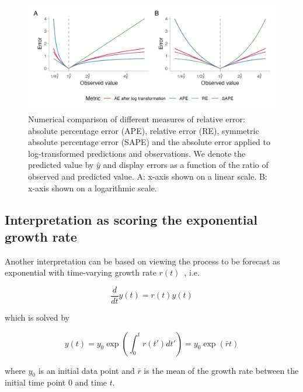 \documentclass{article}
\begin{document}
\begin{figure}[h!]
\centering
\includegraphics[width = 1\textwidth]{output/figures/different-relative-errors.png}
\caption{Numerical comparison of different measures of relative error: absolute percentage error (APE), relative error (RE), symmetric absolute percentage error (SAPE) and the absolute error applied to log-transformed predictions and observations. We denote the predicted value by $\hat{y}$ and display errors as a function of the ratio of observed and predicted value. A: x-axis shown on a linear scale. B: x-axis shown on a logarithmic scale.}
\label{fig:SAPE}
\end{figure}





\subsection{Interpretation as scoring the exponential growth rate}
\label{sec:methods:growthrate}

Another interpretation can be based on viewing the process to be forecast as exponential with time-varying growth rate $r(t)$~\citep[see, e.g.,][]{wallingaHowGenerationIntervals2007}, i.e.
\begin{linenomath*}
\begin{equation*}
\frac{d}{dt}y(t) = r(t)y(t)
\end{equation*}
\end{linenomath*}
%
which is solved by
%
\begin{linenomath*}
\begin{equation*}
y(t) = y_0 \exp \left( \int_0^t r(t') dt' \right) = y_0 \exp (\bar{r}t)
\end{equation*}
\end{linenomath*}
where $y_0$ is an initial data point and $\bar{r}$ is the mean of the growth rate between the initial time point $0$ and time $t$.
\end{document}
